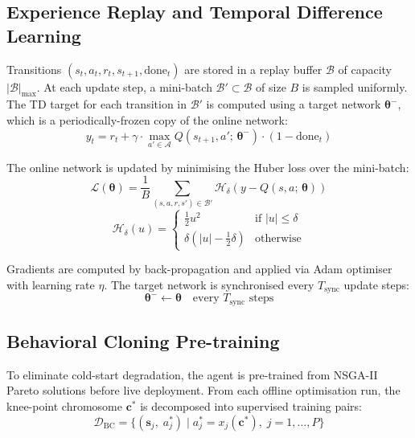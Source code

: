 \documentclass[12pt,a4paper]{article}
\theoremstyle{definition}
\theoremstyle{remark}
\begin{document}
\subsection{Experience Replay and Temporal Difference Learning}

Transitions $(s_t, a_t, r_t, s_{t+1}, \text{done}_t)$ are stored in a replay
buffer $\mathcal{B}$ of capacity $|\mathcal{B}|_{\max}$. At each update step,
a mini-batch $\mathcal{B}' \subset \mathcal{B}$ of size $B$ is sampled uniformly.
The TD target for each transition in $\mathcal{B}'$ is computed using a
target network $\bm{\theta}^{-}$, which is a periodically-frozen copy of
the online network:
\begin{equation}
  y_t = r_t + \gamma \cdot
  \max_{a' \in \mathcal{A}} Q(s_{t+1}, a';\, \bm{\theta}^{-})
  \cdot (1 - \text{done}_t)
  \label{eq:td_target}
\end{equation}

The online network is updated by minimising the Huber loss over the mini-batch:
\begin{equation}
  \mathcal{L}(\bm{\theta}) = \frac{1}{B} \sum_{(s,a,r,s') \in \mathcal{B}'}
  \mathcal{H}_\delta\!\left(y - Q(s, a;\, \bm{\theta})\right)
  \label{eq:huber}
\end{equation}
\begin{equation}
  \mathcal{H}_\delta(u) =
  \begin{cases}
    \tfrac{1}{2} u^2              & \text{if } |u| \leq \delta \\
    \delta (|u| - \tfrac{1}{2}\delta) & \text{otherwise}
  \end{cases}
  \label{eq:huber_def}
\end{equation}

Gradients are computed by back-propagation and applied via Adam optimiser
with learning rate $\eta$. The target network is synchronised every
$T_{\text{sync}}$ update steps:
\begin{equation}
  \bm{\theta}^{-} \leftarrow \bm{\theta}
  \quad \text{every } T_{\text{sync}} \text{ steps}
  \label{eq:target_sync}
\end{equation}

\subsection{Behavioral Cloning Pre-training}

To eliminate cold-start degradation, the agent is pre-trained from NSGA-II
Pareto solutions before live deployment. From each offline optimisation run,
the knee-point chromosome $\mathbf{c}^*$ is decomposed into supervised
training pairs:
\begin{equation}
  \mathcal{D}_{\text{BC}} = \bigl\{
    (\mathbf{s}_j,\; a_j^*) \;\big|\;
    a_j^* = x_j(\mathbf{c}^*),\; j = 1,\ldots,P
  \bigr\}
  \label{eq:bc_dataset}
\end{equation}
\end{document}
